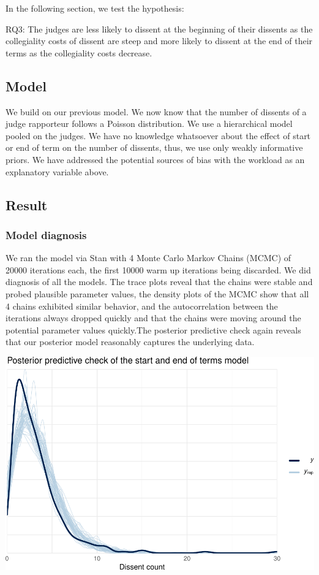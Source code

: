 \documentclass[
  11pt,
]{article}
\begin{document}
In the following section, we test the hypothesis:

RQ3: The judges are less likely to dissent at the beginning of their
dissents as the collegiality costs of dissent are steep and more likely
to dissent at the end of their terms as the collegiality costs decrease.

\hypertarget{model-1}{%
\subsection{Model}\label{model-1}}

We build on our previous model. We now know that the number of dissents
of a judge rapporteur follows a Poisson distribution. We use a
hierarchical model pooled on the judges. We have no knowledge whatsoever
about the effect of start or end of term on the number of dissents,
thus, we use only weakly informative priors. We have addressed the
potential sources of bias with the workload as an explanatory variable
above.

\hypertarget{result-2}{%
\subsection{Result}\label{result-2}}

\hypertarget{model-diagnosis-1}{%
\subsubsection{Model diagnosis}\label{model-diagnosis-1}}

We ran the model via Stan with 4 Monte Carlo Markov Chains (MCMC) of
20000 iterations each, the first 10000 warm up iterations being
discarded. We did diagnosis of all the models. The trace plots reveal
that the chains were stable and probed plausible parameter values, the
density plots of the MCMC show that all 4 chains exhibited similar
behavior, and the autocorrelation between the iterations always dropped
quickly and that the chains were moving around the potential parameter
values quickly.The posterior predictive check again reveals that our
posterior model reasonably captures the underlying data.

\includegraphics{dissents_article_files/figure-latex/posterior_check_term-1.pdf}
\end{document}
